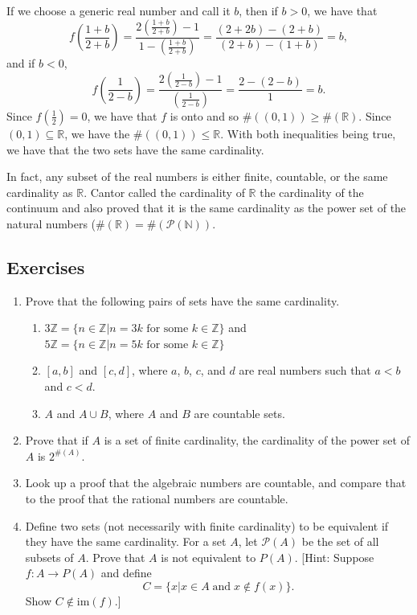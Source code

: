 \documentclass[
]{book}
\providecommand{\tightlist}{%
  \setlength{\itemsep}{0pt}\setlength{\parskip}{0pt}}
\theoremstyle{definition}
\theoremstyle{definition}
\theoremstyle{definition}
\theoremstyle{definition}
\theoremstyle{remark}
\begin{document}
If we choose a generic real number and call it \(b\), then if \(b>0\), we have that
\[f\left( \frac{1+b}{2+b} \right) = \frac{2\left(\frac{1+b}{2+b}\right) -1}{1-\left(\frac{1+b}{2+b}\right)} = \frac{(2+2b)-(2+b)}{(2+b)-(1+b)} = b,\] and if \(b<0\),
\[f\left( \frac{1}{2-b}\right) = \frac{2\left(\frac{1}{2-b}\right) -1}{\left(\frac{1}{2-b}\right)} = \frac{2-(2-b)}{1} = b.\] Since \(f\left(\frac{1}{2}\right)=0\), we have that \(f\) is onto and so \(\# ((0,1)) \geq \# (\mathbb{R})\). Since \((0,1)\subseteq \mathbb{R}\), we have the \(\#((0,1)) \leq \mathbb{R}\). With both inequalities being true, we have that the two sets have the same cardinality.

In fact, any subset of the real numbers is either finite, countable, or the same cardinality as \(\mathbb{R}\). Cantor called the cardinality of \(\mathbb{R}\) the cardinality of the continuum and also proved that it is the same cardinality as the power set of the natural numbers (\(\#(\mathbb{R}) = \#(\mathcal{P}(\mathbb{N}))\).

\hypertarget{exercises-19}{%
\subsection{Exercises}\label{exercises-19}}

\begin{enumerate}
\def\labelenumi{\arabic{enumi}.}
\item
  Prove that the following pairs of sets have the same cardinality.

  \begin{enumerate}
  \def\labelenumii{\alph{enumii}.}
  \tightlist
  \item
    \(3\mathbb{Z} = \{n\in \mathbb{Z}\vert n=3k \mbox{ for some } k\in \mathbb{Z}\}\) and \(5\mathbb{Z} = \{n\in \mathbb{Z}\vert n=5k \mbox{ for some } k\in \mathbb{Z}\}\)
  \item
    \([a,b]\) and \([c,d]\), where \(a\), \(b\), \(c\), and \(d\) are real numbers such that \(a<b\) and \(c<d\).
  \item
    \(A\) and \(A\cup B\), where \(A\) and \(B\) are countable sets.
  \end{enumerate}
\item
  Prove that if \(A\) is a set of finite cardinality, the cardinality of the power set of \(A\) is \(2^{\#(A)}\).
\item
  Look up a proof that the algebraic numbers are countable, and compare that to the proof that the rational numbers are countable.
\item
  Define two sets (not necessarily with finite cardinality) to be equivalent if they have the same cardinality.
  For a set \(A\), let \(\mathcal{P}(A)\) be the set of all subsets of \(A\). Prove that \(A\) is not equivalent to \(P(A)\). {[}Hint: Suppose \(f:A\rightarrow P(A)\) and define \[C=\{ x\vert  x\in A \; \mbox{and} \; x\not \in f(x) \}.\] Show \(C\not \in \mbox{im}(f)\).{]}
\end{enumerate}
\end{document}
